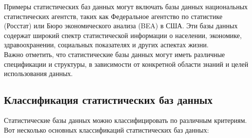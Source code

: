 Примеры статистических баз данных могут включать базы данных национальных статистических агентств, таких как Федеральное агентство по статистике (Росстат) или Бюро экономического анализа (BEA) в США. Эти базы данных содержат широкий спектр статистической информации о населении, экономике, здравоохранении, социальных показателях и других аспектах жизни.
\\

Важно отметить, что статистические базы данных могут иметь различные спецификации и структуры, в зависимости от конкретной области знаний и целей использования данных.


\subsection{Классификация статистических баз данных}

Статистические базы данных можно классифицировать по различным критериям. Вот несколько основных классификаций статистических баз данных:
\\

